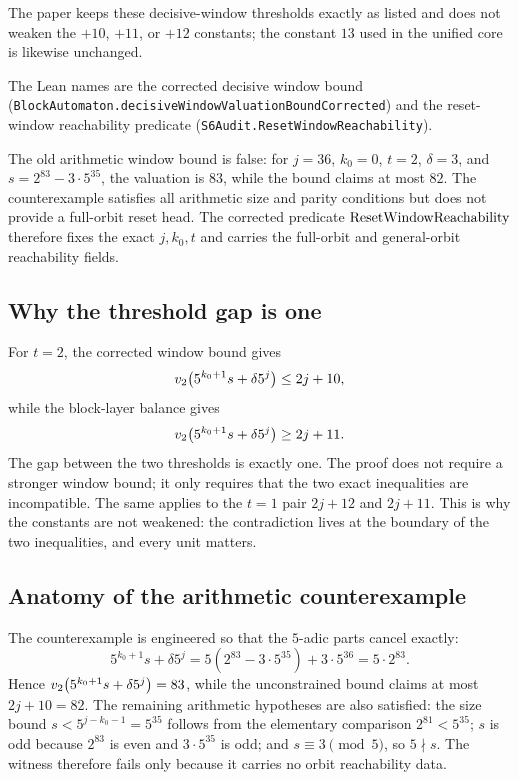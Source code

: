 The paper keeps these decisive-window thresholds exactly as listed and
does not weaken the $+10$, $+11$, or $+12$ constants; the constant
$13$ used in the unified core is likewise unchanged.

The Lean names are the corrected decisive window bound
(\texttt{BlockAutomaton.decisiveWindowValuationBoundCorrected}) and
the reset-window reachability predicate
(\texttt{S6Audit.ResetWindowReachability}).

\begin{remark}
The old arithmetic window bound is false: for
$j=36$, $k_0=0$, $t=2$, $\delta=3$, and
$s=2^{83}-3\cdot5^{35}$, the valuation is $83$, while the bound claims
at most $82$.  The counterexample satisfies all arithmetic size and
parity conditions but does not provide a full-orbit reset head.  The
corrected predicate $\mathrm{ResetWindowReachability}$ therefore fixes the exact
$j,k_0,t$ and carries the full-orbit and general-orbit reachability
fields.
\end{remark}

\subsection{Why the threshold gap is one}

For $t=2$, the corrected window bound gives
\begin{equation*}
  v_2\!\left(5^{k_0+1}s+\delta5^j\right)\le2j+10,
\end{equation*}
while the block-layer balance gives
\begin{equation*}
  v_2\!\left(5^{k_0+1}s+\delta5^j\right)\ge2j+11.
\end{equation*}
The gap between the two thresholds is exactly one.  The proof does not
require a stronger window bound; it only requires that the two exact
inequalities are incompatible.  The same applies to the $t=1$ pair
$2j+12$ and $2j+11$.  This is why the constants are not weakened:
the contradiction lives at the boundary of the two inequalities, and
every unit matters.

\subsection{Anatomy of the arithmetic counterexample}

The counterexample is engineered so that the $5$-adic parts cancel
exactly:
\begin{equation*}
  5^{k_0+1}s+\delta5^j
    =5(2^{83}-3\cdot5^{35})+3\cdot5^{36}
    =5\cdot2^{83}.
\end{equation*}
Hence $v_2\!\left(5^{k_0+1}s+\delta5^j\right)=83$, while the unconstrained bound
claims at most $2j+10=82$.  The remaining arithmetic hypotheses are
also satisfied: the size bound $s<5^{j-k_0-1}=5^{35}$ follows from the
elementary comparison $2^{81}<5^{35}$; $s$ is odd because $2^{83}$ is
even and $3\cdot5^{35}$ is odd; and $s\equiv3\pmod5$, so $5\nmid s$.
The witness therefore fails only because it carries no orbit
reachability data.

